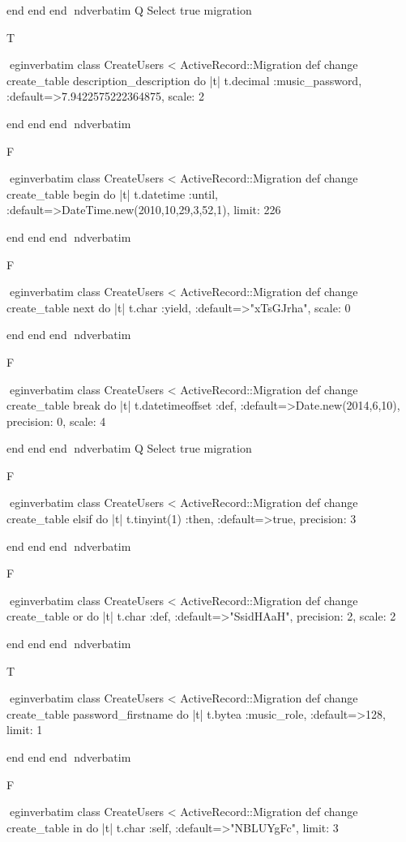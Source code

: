     end 
  end 
end
nd{verbatim}
Q
 Select true migration

T

egin{verbatim}
 class CreateUsers < ActiveRecord::Migration 
  def change 
    create_table description_description do |t| 
      t.decimal :music_password, :default=>7.9422575222364875, scale: 2
    
    end 
  end 
end
nd{verbatim}

F

egin{verbatim}
 class CreateUsers < ActiveRecord::Migration 
  def change 
    create_table begin do |t| 
      t.datetime :until, :default=>DateTime.new(2010,10,29,3,52,1), limit: 226
    
    end 
  end 
end
nd{verbatim}

F

egin{verbatim}
 class CreateUsers < ActiveRecord::Migration 
  def change 
    create_table next do |t| 
      t.char :yield, :default=>"xTsGJrha", scale: 0
    
    end 
  end 
end
nd{verbatim}

F

egin{verbatim}
 class CreateUsers < ActiveRecord::Migration 
  def change 
    create_table break do |t| 
      t.datetimeoffset :def, :default=>Date.new(2014,6,10), precision: 0, scale: 4
    
    end 
  end 
end
nd{verbatim}
Q
 Select true migration

F

egin{verbatim}
 class CreateUsers < ActiveRecord::Migration 
  def change 
    create_table elsif do |t| 
      t.tinyint(1) :then, :default=>true, precision: 3
    
    end 
  end 
end
nd{verbatim}

F

egin{verbatim}
 class CreateUsers < ActiveRecord::Migration 
  def change 
    create_table or do |t| 
      t.char :def, :default=>"SsidHAaH", precision: 2, scale: 2
    
    end 
  end 
end
nd{verbatim}

T

egin{verbatim}
 class CreateUsers < ActiveRecord::Migration 
  def change 
    create_table password_firstname do |t| 
      t.bytea :music_role, :default=>128, limit: 1
    
    end 
  end 
end
nd{verbatim}

F

egin{verbatim}
 class CreateUsers < ActiveRecord::Migration 
  def change 
    create_table in do |t| 
      t.char :self, :default=>"NBLUYgFc", limit: 3
    
